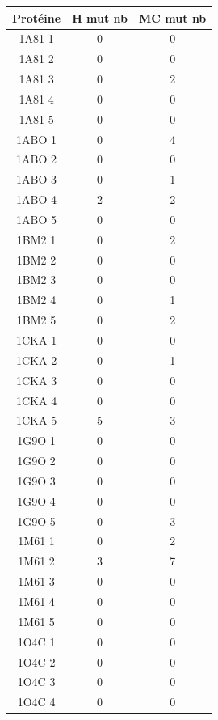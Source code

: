     \begin{table}[h]
      \centering

      \begin{tabular}{|c|c|c|}


        \hline
        Protéine & H mut nb & MC mut nb \\
        \hline
        1A81 1 & 0  & 0 \\    
        1A81 2 & 0  & 0 \\
        1A81 3 & 0  & 2 \\
        1A81 4 & 0  & 0 \\
        1A81 5 & 0  & 0 \\
        1ABO 1 & 0  & 4 \\ 
        1ABO 2 & 0  & 0 \\
        1ABO 3 & 0  & 1 \\
        1ABO 4 & 2  & 2 \\
        1ABO 5 & 0  & 0 \\
        1BM2 1 & 0  & 2 \\
        1BM2 2 & 0  & 0 \\
        1BM2 3 & 0  & 0 \\
        1BM2 4 & 0  & 1 \\
        1BM2 5 & 0  & 2 \\
        1CKA 1 & 0  & 0 \\
        1CKA 2 & 0  & 1 \\
        1CKA 3 & 0  & 0 \\
        1CKA 4 & 0  & 0 \\
        1CKA 5 & 5  & 3 \\
        1G9O 1 & 0  & 0 \\
        1G9O 2 & 0  & 0 \\
        1G9O 3 & 0  & 0 \\
        1G9O 4 & 0  & 0 \\
        1G9O 5 & 0  & 3 \\
        1M61 1 & 0  & 2 \\
        1M61 2 & 3  & 7 \\
        1M61 3 & 0  & 0 \\
        1M61 4 & 0  & 0 \\
        1M61 5 & 0  & 0 \\
        1O4C 1 & 0  & 0 \\
        1O4C 2 & 0  & 0 \\
        1O4C 3 & 0  & 0 \\
        1O4C 4 & 0  & 0 \\

\end{tabular}
\end{table}
